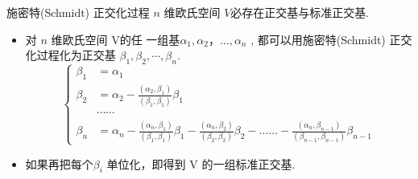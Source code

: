 \documentclass[13pt]{beamer}
\begin{document}
\begin{frame}{施密特(Schmidt) 正交化过程}
 $n$ 维欧氏空间 $V$必存在正交基与标准正交基.
 \begin{itemize}
	\item 对 $n$ 维欧氏空间 V的任
一组基$\alpha_1, \alpha_2，..., \alpha_n$ , 都可以用\alert{施密特(Schmidt) 正交化过程}化为正交基
$\beta_1, \beta_{2}, \cdots, \beta_{n}$.
\[\left\{
 \begin{aligned}
\beta_{1} & =\alpha_{1}\\
\beta_{2} & =\alpha_{2}-\frac{\left(\alpha_{2}, \beta_{1}\right)}{\left(\beta_{1}, \beta_{1}\right)} \beta_{1}\\
 &  \cdots \cdots\\
\beta_{n} & =
\alpha_{n}-
\frac{\left(\alpha_{n}, \beta_{1}\right)}{\left(\beta_{1}, \beta_{1}\right)} \beta_{1}
-\frac{\left(\alpha_{n}, \beta_{2}\right)}{\left(\beta_{2}, \beta_{2}\right)} \beta_2
-\ldots \ldots
-\frac{\left(\alpha_{n}, \beta_{n-1}\right)}{\left(\beta_{n-1}, \beta_{n-1}\right)} \beta_{n-1}
 \end{aligned}
 \right.
\]

	\item 如果再把每个$\beta_i$ \alert{单位化}，即得到 V 的一组标准正交基.
\end{itemize}

\end{frame}
\end{document}
